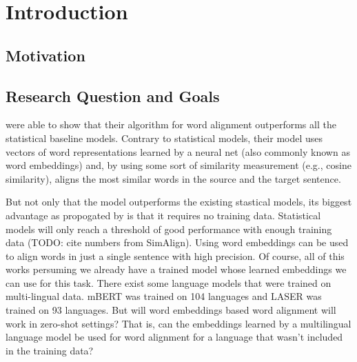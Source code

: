 \chapter{Introduction}
\section{Motivation}


\section{Research Question and Goals}
\cite{jalili-sabet-etal-2020-simalign} were able to show that their algorithm for word alignment outperforms all the statistical baseline models. 
Contrary to statistical models, their model uses vectors of word representations learned by a neural net (also commonly known as word embeddings) and, by using some sort of similarity measurement (e.g., cosine similarity), aligns the most similar words in the source and the target sentence. 

But not only that the model outperforms the existing stastical models, its biggest advantage as propogated by \cite{jalili-sabet-etal-2020-simalign} is that it requires no training data. 
Statistical models will only reach a threshold of good performance with enough training data (TODO: cite numbers from SimAlign). 
Using word embeddings can be used to align words in just a single sentence with high precision. 
Of course, all of this works persuming we already have a trained model whose learned embeddings we can use for this task. 
There exist some language models that were trained on multi-lingual data. 
mBERT was trained on 104 languages and LASER was trained on 93 languages. 
But will word embeddings based word alignment will work in zero-shot settings? 
That is, can the embeddings learned by a multilingual language model be used for word alignment for a language that wasn't included in the training data?

